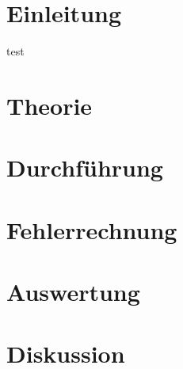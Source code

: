 


	
	
	
	\section{Einleitung} \label{sec:Einleitung}
			
		test\cite{GGU}
	\section{Theorie}\label{sec:Theorie}
		
	\section{Durchführung}\label{sec:Durchfuehrung}
		
	\section{Fehlerrechnung}\label{sec:Fehlerrechnung}
		
	\section{Auswertung}\label{sec:Auswertung}
		
	\section{Diskussion}\label{sec:Diskussion}
		
	\newpage
	\printbibliography
		
	

